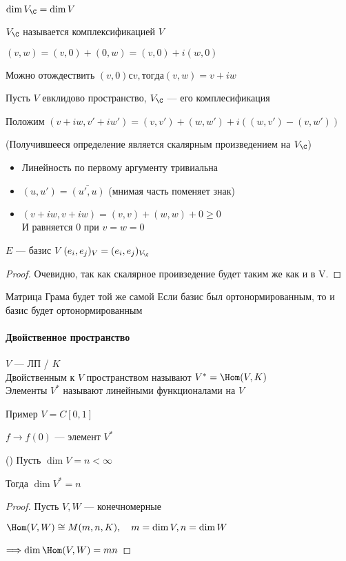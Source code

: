 \follow $\dim V_{\C} = \dim V$

$V_{\C}$ называется комплексификацией $V$

$(v, w) = (v, 0) + (0, w) = (v, 0) + i(w, 0)$

Можно отождествить $(v, 0) с v, тогда (v, w) = v + iw$

Пусть $V$ евклидово пространство, $V_{\C}$ --- его комплесификация

Положим $(v + iw, v' + iw') = (v, v') + (w, w') + i((w, v') - (v, w'))$

\begin{theorem}(Получившееся определение является скалярным произведением на $V_{\C}$)
    \begin{itemize}
        \item Линейность по первому аргументу тривиальна
        \item $(u, u') = \bar{(u', u)}$ (мнимая часть поменяет знак)
        \item $(v + iw, v + iw) = (v, v) + (w, w) + 0 \geqslant 0$ \\
        И равняется $0$ при $v = w = 0$
    \end{itemize}
\end{theorem}
\notice $E$ --- базис $V$
$(e_i, e_j)_V = (e_i, e_j)_{V_{\C}}$
\begin{proof}
\emptyln
Очевидно, так как скалярное проивзедение будет таким же как и в V.
\end{proof}
Матрица Грама будет той же самой
Если базис был ортонормированным, то и базис будет ортонормированным


\paragraph{Двойственное пространство}
\begin{conj}
    $V$ --- ЛП / $K$ \\
    Двойственным к $V$ пространством называют $V^* = \Hom(V, K)$ \\
    Элементы $V^*$ называют линейными функционалами на $V$
\end{conj}

Пример
$V = C[0, 1]$

$f \to f(0)$ --- элемент $V^*$

\begin{theorem}()
    Пусть $\dim V = n < \infty$

    Тогда $\dim V^* = n$

    \begin{proof}
    \emptyln
    Пусть $V, W$ --- конечномерные

    $\Hom(V, W) \cong M(m, n, K), \quad m = \dim V, n = \dim W$

    $\Longrightarrow \dim \Hom(V, W) = mn$
    \end{proof}
\end{theorem}


